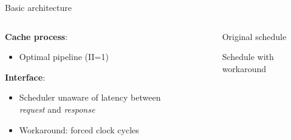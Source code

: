 \documentclass[aspectratio=169]{beamer}
\begin{document}
\begin{frame}{Basic architecture}
	\begin{columns}
		\begin{column}{.5\textwidth}
			\textbf{Cache process}:
			\begin{itemize}
				\item Optimal pipeline (II=1)
			\end{itemize}
			
			\bigskip
			\textbf{Interface}:
			\begin{itemize}
				\item Scheduler unaware of latency between
					\emph{request} and \emph{response}
				\item Workaround: forced clock cycles
			\end{itemize}
		\end{column}
		\begin{column}{.5\textwidth}
			\begin{center}
				\begin{figure}
					\caption{Original schedule}
				\end{figure}
				\begin{figure}
					\caption{Schedule with workaround}
				\end{figure}
			\end{center}
		\end{column}
	\end{columns}
\end{frame}
\end{document}
